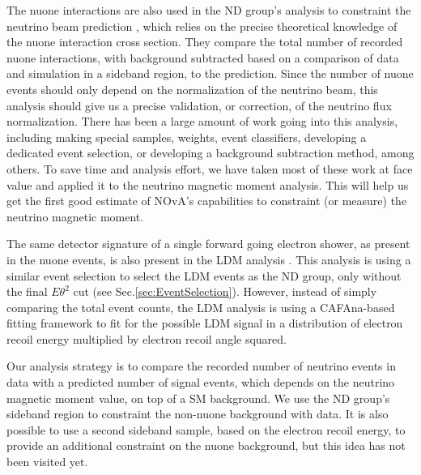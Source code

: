 The \gls{nuone} interactions are also used in the \gls{ND} group's analysis to constraint the neutrino beam prediction \cite{NOVA-doc-56383}, which relies on the precise theoretical knowledge of the \gls{nuone} interaction cross section. They compare the total number of recorded \gls{nuone} interactions, with background subtracted based on a comparison of data and simulation in a sideband region, to the prediction. Since the number of \gls{nuone} events should only depend on the normalization of the neutrino beam, this analysis should give us a precise validation, or correction, of the neutrino flux normalization. There has been a large amount of work going into this analysis, including making special samples, weights, event classifiers, developing a dedicated event selection, or developing a background subtraction method, among others. To save time and analysis effort, we have taken most of these work at face value and applied it to the neutrino magnetic moment analysis. This will help us get the first good estimate of \gls{NOvA}'s capabilities to constraint (or measure) the neutrino magnetic moment.

The same detector signature of a single forward going electron shower, as present in the \gls{nuone} events, is also present in the \gls{LDM} analysis \cite{NOVA-doc-59439}. This analysis is using a similar event selection to select the \gls{LDM} events as the \gls{ND} group, only without the final $E\theta^2$ cut (see Sec.\ref{sec:EventSelection}). However, instead of simply comparing the total event counts, the \gls{LDM} analysis is using a CAFAna-based fitting framework to fit for the possible \gls{LDM} signal in a distribution of electron recoil energy multiplied by electron recoil angle squared.


Our analysis strategy is to compare the recorded number of neutrino events in data with a predicted number of signal events, which depends on the neutrino magnetic moment value, on top of a \gls{SM} background. We use the \gls{ND} group's sideband region to constraint the non-\gls{nuone} background with data. It is also possible to use a second sideband sample, based on the electron recoil energy, to provide an additional constraint on the \gls{nuone} background, but this idea has not been visited yet.

